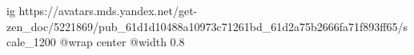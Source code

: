  
 
 
 
 

\ifcmt
  ig https://avatars.mds.yandex.net/get-zen_doc/5221869/pub_61d1d10488a10973c71261bd_61d2a75b2666fa71f893ff65/scale_1200
	@wrap center
	@width 0.8
\fi
